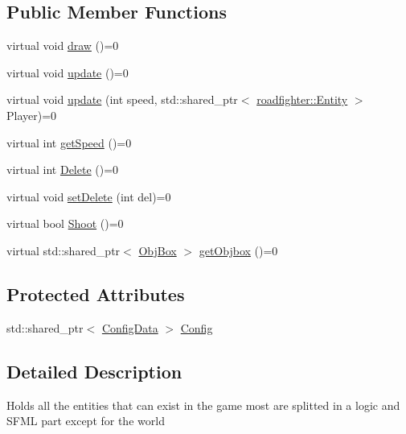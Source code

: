 \subsection*{Public Member Functions}
\begin{DoxyCompactItemize}
\item 
virtual void \hyperlink{classroadfighter_1_1Entity_ac516f8005f969ad5a86c252e5a3640ee}{draw} ()=0
\item 
virtual void \hyperlink{classroadfighter_1_1Entity_a19cd353f12a3e8432acd6d5609137561}{update} ()=0
\item 
virtual void \hyperlink{classroadfighter_1_1Entity_a611ba56595dd2137d308876ba820cc09}{update} (int speed, std\+::shared\+\_\+ptr$<$ \hyperlink{classroadfighter_1_1Entity}{roadfighter\+::\+Entity} $>$ Player)=0
\item 
virtual int \hyperlink{classroadfighter_1_1Entity_ad3760184d764a61922e1db7d98501ee4}{get\+Speed} ()=0
\item 
virtual int \hyperlink{classroadfighter_1_1Entity_a08190b0b8e6a3fcdb42273d6096152ac}{Delete} ()=0
\item 
virtual void \hyperlink{classroadfighter_1_1Entity_a07e973f0fa941a69e749629716877692}{set\+Delete} (int del)=0
\item 
virtual bool \hyperlink{classroadfighter_1_1Entity_ad0ecaa0539db252e591da83814251509}{Shoot} ()=0
\item 
virtual std\+::shared\+\_\+ptr$<$ \hyperlink{structObjBox}{Obj\+Box} $>$ \hyperlink{classroadfighter_1_1Entity_af14340d04a725175a6d221f23c35fa0c}{get\+Objbox} ()=0
\end{DoxyCompactItemize}
\subsection*{Protected Attributes}
\begin{DoxyCompactItemize}
\item 
std\+::shared\+\_\+ptr$<$ \hyperlink{classConfigData}{Config\+Data} $>$ \hyperlink{classroadfighter_1_1Entity_ab69d36ac1aea7450bf4f443a17af58c7}{Config}
\end{DoxyCompactItemize}


\subsection{Detailed Description}
Holds all the entities that can exist in the game most are splitted in a logic and S\+F\+ML part except for the world 

